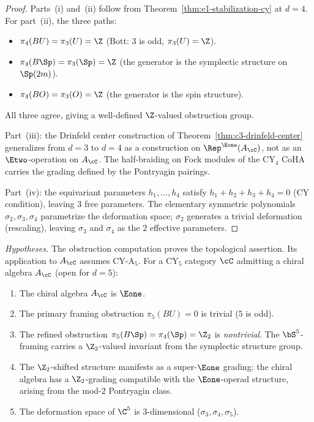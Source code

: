 \begin{proof}
Parts~(i) and~(ii) follow from Theorem~\ref{thm:e1-stabilization-cy} at $d = 4$. For part~(ii), the three paths:
\begin{itemize}
 \item $\pi_4(BU) = \pi_3(U) = \Z$ (Bott: $3$ is odd, $\pi_3(U) = \Z$).
 \item $\pi_4(B\Sp) = \pi_3(\Sp) = \Z$ (the generator is the symplectic structure on $\Sp(2m)$).
 \item $\pi_4(BO) = \pi_3(O) = \Z$ (the generator is the spin structure).
\end{itemize}
All three agree, giving a well-defined $\Z$-valued obstruction group.

Part~(iii): the Drinfeld center construction of Theorem~\ref{thm:c3-drinfeld-center} generalizes from $d = 3$ to $d = 4$ as a construction on \(\Rep^{\Eone}(A_\cC)\), not as an \(\Etwo\)-operation on \(A_\cC\). The half-braiding on Fock modules of the CY$_4$ CoHA carries the grading defined by the Pontryagin pairings.

Part~(iv): the equivariant parameters $h_1, \ldots, h_4$ satisfy $h_1 + h_2 + h_3 + h_4 = 0$ (CY condition), leaving $3$ free parameters. The elementary symmetric polynomials $\sigma_2, \sigma_3, \sigma_4$ parametrize the deformation space; $\sigma_2$ generates a trivial deformation (rescaling), leaving $\sigma_3$ and $\sigma_4$ as the $2$ effective parameters.
\end{proof}


\begin{corollary}[\texorpdfstring{$d = 5$}{d = 5}: the \texorpdfstring{$\Z_2$}{Z-2} Sp-refinement]
\label{cor:d5-z2}
\noindent\emph{Hypotheses.} The obstruction computation proves the topological assertion. Its application to $A_\cC$ assumes CY-A$_5$.
For a CY$_5$ category $\cC$ admitting a chiral algebra $A_\cC$ (open for $d = 5$):
\begin{enumerate}[label=\textup{(\roman*)}]
 \item The chiral algebra $A_\cC$ is $\Eone$.
 \item The primary framing obstruction $\pi_5(BU) = 0$ is trivial ($5$ is odd).
 \item The refined obstruction $\pi_5(B\Sp) = \pi_4(\Sp) = \Z_2$ is \emph{nontrivial}. The $\bS^5$-framing carries a $\Z_2$-valued invariant from the symplectic structure group.
 \item The $\Z_2$-shifted structure manifests as a super-$\Eone$ grading: the chiral algebra has a $\Z_2$-grading compatible with the $\Eone$-operad structure, arising from the mod-$2$ Pontryagin class.
 \item The deformation space of $\C^5$ is $3$-dimensional ($\sigma_3, \sigma_4, \sigma_5$).
\end{enumerate}
\end{corollary}

